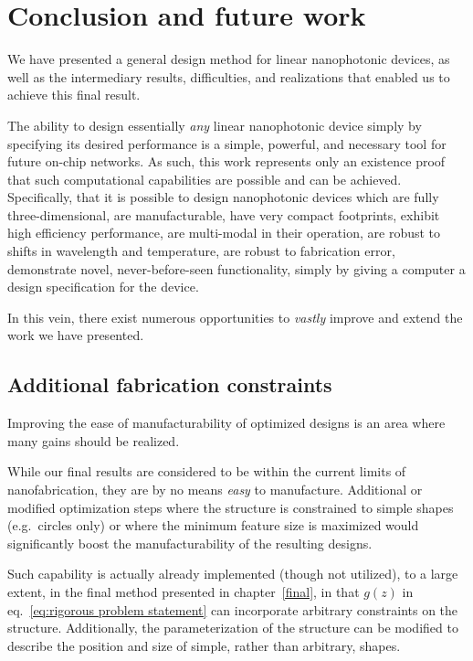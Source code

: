 \chapter{Conclusion and future work}\label{conclusion}

We have presented a general design method
    for linear nanophotonic devices,
    as well as the intermediary results, difficulties, and realizations
    that enabled us to achieve this final result.

The ability to design essentially \emph{any} linear nanophotonic device
    simply by specifying its desired performance
    is a simple, powerful, and necessary tool for future 
    on-chip networks.
As such, this work represents only an existence proof
    that such computational capabilities are possible 
    and can be achieved.
Specifically, that it is possible to design nanophotonic devices which
    \BI are fully three-dimensional,
    \I  are manufacturable,
    \I  have very compact footprints,
    \I  exhibit high efficiency performance,
    \I  are multi-modal in their operation,
    \I  are robust to shifts in wavelength and temperature,
    \I  are robust to fabrication error,
    \I  demonstrate novel, never-before-seen functionality, \EI
    simply by giving a computer a design specification for the device.

In this vein, there exist numerous opportunities 
    to \emph{vastly} improve and extend the work we have presented.

\section{Additional fabrication constraints}
Improving the ease of manufacturability of optimized designs
    is an area where many gains should be realized.

While our final results are considered to be within
    the current limits of nanofabrication,
    they are by no means \emph{easy} to manufacture.
Additional or modified optimization steps
    where the structure is constrained to simple shapes (e.g.~circles only)
    or where the minimum feature size is maximized
    would significantly boost the manufacturability of the resulting designs.
    
Such capability is actually already implemented (though not utilized), 
    to a large extent,
    in the final method presented in chapter~\ref{final},
    in that $g(z)$ in eq.~\eqref{eq:rigorous problem statement}
    can incorporate arbitrary constraints on the structure.
Additionally, the parameterization of the structure can be modified
    to describe the position and size of simple, 
    rather than arbitrary, shapes.


